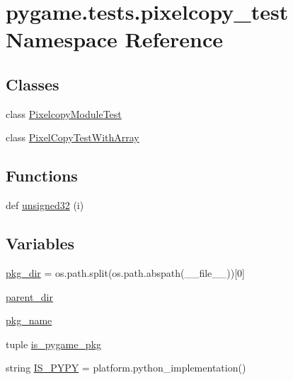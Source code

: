 \hypertarget{namespacepygame_1_1tests_1_1pixelcopy__test}{}\section{pygame.\+tests.\+pixelcopy\+\_\+test Namespace Reference}
\label{namespacepygame_1_1tests_1_1pixelcopy__test}
\subsection*{Classes}
\begin{DoxyCompactItemize}
\item 
class \hyperlink{classpygame_1_1tests_1_1pixelcopy__test_1_1_pixelcopy_module_test}{Pixelcopy\+Module\+Test}
\item 
class \hyperlink{classpygame_1_1tests_1_1pixelcopy__test_1_1_pixel_copy_test_with_array}{Pixel\+Copy\+Test\+With\+Array}
\end{DoxyCompactItemize}
\subsection*{Functions}
\begin{DoxyCompactItemize}
\item 
def \hyperlink{namespacepygame_1_1tests_1_1pixelcopy__test_ac5d23f349c859bd9bc29f6579a9edd1f}{unsigned32} (i)
\end{DoxyCompactItemize}
\subsection*{Variables}
\begin{DoxyCompactItemize}
\item 
\hyperlink{namespacepygame_1_1tests_1_1pixelcopy__test_aa6542545c15d325f6ecc556fc820ee5b}{pkg\+\_\+dir} = os.\+path.\+split(os.\+path.\+abspath(\+\_\+\+\_\+file\+\_\+\+\_\+))\mbox{[}0\mbox{]}
\item 
\hyperlink{namespacepygame_1_1tests_1_1pixelcopy__test_ab87c7d6dfeefc8bcefc1f6c9efd924fd}{parent\+\_\+dir}
\item 
\hyperlink{namespacepygame_1_1tests_1_1pixelcopy__test_a77fcc147b1e13eb73640f5344082fc9a}{pkg\+\_\+name}
\item 
tuple \hyperlink{namespacepygame_1_1tests_1_1pixelcopy__test_ab03c40d2159eeb7f3a5210cbfe91d5c5}{is\+\_\+pygame\+\_\+pkg}
\item 
string \hyperlink{namespacepygame_1_1tests_1_1pixelcopy__test_afe0d4069517ad2d11edaaaa4b252a076}{I\+S\+\_\+\+P\+Y\+PY} = platform.\+python\+\_\+implementation()
\end{DoxyCompactItemize}


